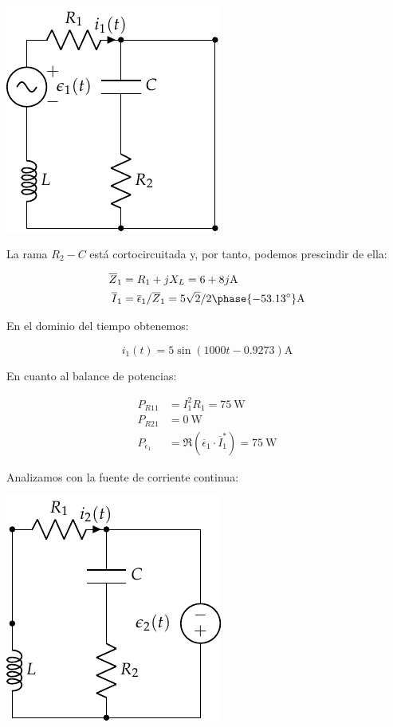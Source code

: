 \begin{center}
\includegraphics{figuras/superposicion1_AC}
\end{center}

La rama $R_2 - C$ está cortocircuitada y, por tanto, podemos prescindir de ella:

\begin{align*}
  \overline{Z}_1 &= R_1 + jX_L = 6 + 8j\si{\ampere}\\
  \overline{I}_1 &= \overline{\epsilon}_1 / \overline{Z}_1 = 5\sqrt{2}/2\phase{\ang{-53.13}}\si{\ampere}
\end{align*}

En el dominio del tiempo obtenemos:

\begin{equation*}
  i_1(t) = 5\sin(1000t - 0.9273)\si{\ampere}
\end{equation*}

En cuanto al balance de potencias:

\begin{align*}
  P_{R11} &= I_1^2 R_1 = \qty{75}{\watt}\\
  P_{R21} &= \qty{0}{\watt}\\
  P_{\epsilon_1} &= \Re(\overline{\epsilon}_1 \cdot \overline{I}_1^*) = \qty{75}{\watt}
\end{align*}

Analizamos con la fuente de corriente continua:

\begin{center}
\includegraphics{figuras/superposicion1_DC}
\end{center}

